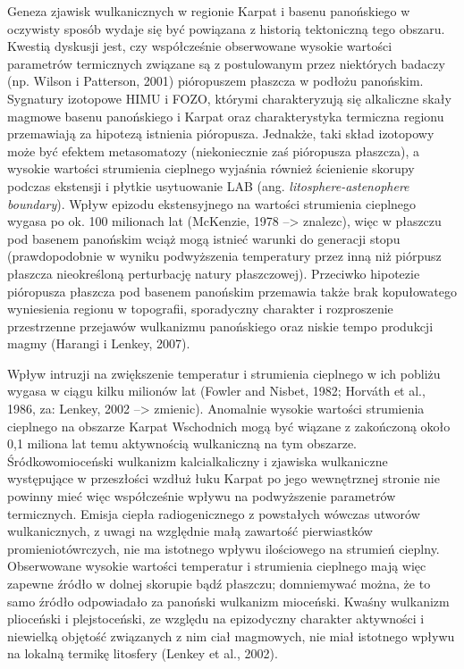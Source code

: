 \documentclass[11.5pt,twoside]{report}
\begin{document}
Geneza zjawisk wulkanicznych w regionie Karpat i basenu panońskiego w oczywisty sposób wydaje się być powiązana z historią tektoniczną tego obszaru. Kwestią dyskusji jest, czy współcześnie obserwowane wysokie wartości parametrów termicznych związane są z postulowanym przez niektórych badaczy (np. Wilson i Patterson, 2001) pióropuszem płaszcza w podłożu panońskim. Sygnatury izotopowe HIMU i FOZO, którymi charakteryzują się alkaliczne skały magmowe basenu panońskiego i Karpat oraz charakterystyka termiczna regionu przemawiają za hipotezą istnienia pióropusza. Jednakże, taki skład izotopowy może być efektem metasomatozy (niekoniecznie zaś pióropusza płaszcza), a wysokie wartości strumienia cieplnego wyjaśnia również ścienienie skorupy podczas ekstensji i płytkie usytuowanie LAB (ang. \textit{litosphere-astenophere boundary}). Wpływ epizodu ekstensyjnego na wartości strumienia cieplnego wygasa po ok. 100 milionach lat (McKenzie, 1978 --> znalezc), więc w płaszczu pod basenem panońskim wciąż mogą istnieć warunki do generacji stopu (prawdopodobnie w wyniku podwyższenia temperatury przez inną niż piórpusz płaszcza nieokreśloną perturbację natury płaszczowej). Przeciwko hipotezie pióropusza płaszcza pod basenem panońskim przemawia także brak kopułowatego wyniesienia regionu w topografii, sporadyczny charakter i rozproszenie przestrzenne przejawów wulkanizmu panońskiego oraz niskie tempo produkcji magmy (Harangi i Lenkey, 2007).    
  
Wpływ intruzji na zwiększenie temperatur i strumienia cieplnego w ich pobliżu wygasa w ciągu kilku milionów lat (Fowler and Nisbet, 1982; Horv\'{a}th et al., 1986, za: Lenkey, 2002 --> zmienic). Anomalnie wysokie wartości strumienia cieplnego na obszarze Karpat Wschodnich mogą być wiązane z zakończoną około 0,1 miliona lat temu aktywnością wulkaniczną na tym obszarze. Śródkowomioceński wulkanizm kalcialkaliczny i zjawiska wulkaniczne występujące w przeszłości wzdłuż łuku Karpat po jego wewnętrznej stronie nie powinny mieć więc współcześnie wpływu na podwyższenie parametrów termicznych. Emisja ciepła radiogenicznego z powstałych wówczas utworów wulkanicznych, z uwagi na względnie małą zawartość pierwiastków promieniotówrczych, nie ma istotnego wpływu ilościowego na strumień cieplny. Obserwowane wysokie wartości temperatur i strumienia cieplnego mają więc zapewne \'{z}ródło w dolnej skorupie bąd\'{z} płaszczu; domniemywać można, że to samo \'{z}ródło odpowiadało za panoński wulkanizm mioceński. Kwaśny wulkanizm plioceński i plejstoceński, ze względu na epizodyczny charakter aktywności i niewielką objętość związanych z nim ciał magmowych, nie miał istotnego wpływu na lokalną termikę litosfery (Lenkey et al., 2002).
\end{document}
